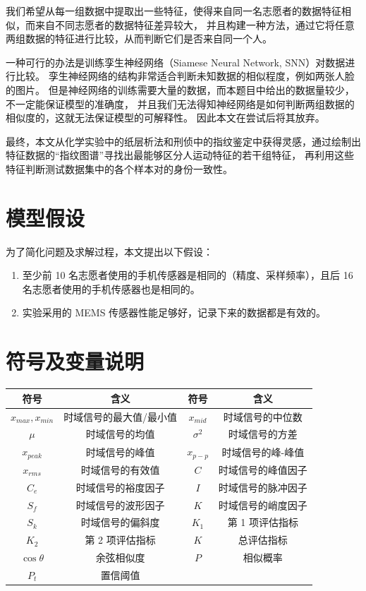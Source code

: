 \documentclass[withoutpreface]{cumcmthesis}
\begin{document}
我们希望从每一组数据中提取出一些特征，使得来自同一名志愿者的数据特征相似，而来自不同志愿者的数据特征差异较大，
并且构建一种方法，通过它将任意两组数据的特征进行比较，从而判断它们是否来自同一个人。

一种可行的办法是训练孪生神经网络（Siamese Neural Network, SNN）对数据进行比较。
孪生神经网络的结构非常适合判断未知数据的相似程度，例如两张人脸的图片。
但是神经网络的训练需要大量的数据，而本题目中给出的数据量较少，不一定能保证模型的准确度，
并且我们无法得知神经网络是如何判断两组数据的相似度的，这就无法保证模型的可解释性。
因此本文在尝试后将其放弃。

最终，本文从化学实验中的纸层析法和刑侦中的指纹鉴定中获得灵感，通过绘制出特征数据的“指纹图谱”寻找出最能够区分人运动特征的若干组特征，
再利用这些特征判断测试数据集中的各个样本对的身份一致性。

\section{模型假设}

为了简化问题及求解过程，本文提出以下假设：
\begin{enumerate}
    \item 至少前 10 名志愿者使用的手机传感器是相同的（精度、采样频率），且后 16 名志愿者使用的手机传感器也是相同的。
    \item 实验采用的 MEMS 传感器性能足够好，记录下来的数据都是有效的。
\end{enumerate}

\newpage

\section{符号及变量说明}

\begin{table}[!htb]
    \centering
    \begin{tabular}{cc|cc}
    \toprule[1.5pt]
        符号 & 含义 & 符号 & 含义 \\
    \midrule[1pt]
        $x_{max}, x_{min}$ & 时域信号的最大值/最小值 & $x_{mid}$ & 时域信号的中位数 \\
        $\mu$ & 时域信号的均值 & $\sigma^2$ & 时域信号的方差 \\
        $x_{peak}$ & 时域信号的峰值 & $x_{p-p}$ & 时域信号的峰-峰值 \\
        $x_{rms}$ & 时域信号的有效值 & $C$ & 时域信号的峰值因子 \\
        $C_e$ & 时域信号的裕度因子 & $I$ & 时域信号的脉冲因子 \\
        $S_f$ & 时域信号的波形因子 & $K$ & 时域信号的峭度因子 \\
        $S_k$ & 时域信号的偏斜度 & $K_1$ & 第 1 项评估指标 \\
        $K_2$ & 第 2 项评估指标 & $K$ & 总评估指标 \\
        $\cos \theta$ & 余弦相似度 & $P$ & 相似概率 \\
        $P_t$ & 置信阈值 & & \\
    \bottomrule[1.5pt]
    \end{tabular}
\end{table}
\end{document}
